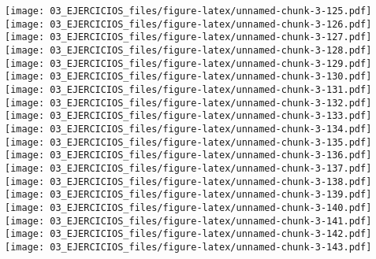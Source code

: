\documentclass[
]{book}
\newenvironment{Shaded}{\begin{snugshade}}{\end{snugshade}}
\newcommand{\AttributeTok}[1]{\textcolor[rgb]{0.77,0.63,0.00}{#1}}
\newcommand{\DecValTok}[1]{\textcolor[rgb]{0.00,0.00,0.81}{#1}}
\newcommand{\FloatTok}[1]{\textcolor[rgb]{0.00,0.00,0.81}{#1}}
\newcommand{\FunctionTok}[1]{\textcolor[rgb]{0.00,0.00,0.00}{#1}}
\newcommand{\NormalTok}[1]{#1}
\newcommand{\OtherTok}[1]{\textcolor[rgb]{0.56,0.35,0.01}{#1}}
\newcommand{\SpecialCharTok}[1]{\textcolor[rgb]{0.00,0.00,0.00}{#1}}
\newcommand{\StringTok}[1]{\textcolor[rgb]{0.31,0.60,0.02}{#1}}
\begin{document}
\texttt{[image: 03\_EJERCICIOS\_files/figure-latex/unnamed-chunk-3-125.pdf]} \texttt{[image: 03\_EJERCICIOS\_files/figure-latex/unnamed-chunk-3-126.pdf]} \texttt{[image: 03\_EJERCICIOS\_files/figure-latex/unnamed-chunk-3-127.pdf]} \texttt{[image: 03\_EJERCICIOS\_files/figure-latex/unnamed-chunk-3-128.pdf]} \texttt{[image: 03\_EJERCICIOS\_files/figure-latex/unnamed-chunk-3-129.pdf]} \texttt{[image: 03\_EJERCICIOS\_files/figure-latex/unnamed-chunk-3-130.pdf]} \texttt{[image: 03\_EJERCICIOS\_files/figure-latex/unnamed-chunk-3-131.pdf]} \texttt{[image: 03\_EJERCICIOS\_files/figure-latex/unnamed-chunk-3-132.pdf]} \texttt{[image: 03\_EJERCICIOS\_files/figure-latex/unnamed-chunk-3-133.pdf]} \texttt{[image: 03\_EJERCICIOS\_files/figure-latex/unnamed-chunk-3-134.pdf]} \texttt{[image: 03\_EJERCICIOS\_files/figure-latex/unnamed-chunk-3-135.pdf]} \texttt{[image: 03\_EJERCICIOS\_files/figure-latex/unnamed-chunk-3-136.pdf]} \texttt{[image: 03\_EJERCICIOS\_files/figure-latex/unnamed-chunk-3-137.pdf]} \texttt{[image: 03\_EJERCICIOS\_files/figure-latex/unnamed-chunk-3-138.pdf]} \texttt{[image: 03\_EJERCICIOS\_files/figure-latex/unnamed-chunk-3-139.pdf]} \texttt{[image: 03\_EJERCICIOS\_files/figure-latex/unnamed-chunk-3-140.pdf]} \texttt{[image: 03\_EJERCICIOS\_files/figure-latex/unnamed-chunk-3-141.pdf]} \texttt{[image: 03\_EJERCICIOS\_files/figure-latex/unnamed-chunk-3-142.pdf]} \texttt{[image: 03\_EJERCICIOS\_files/figure-latex/unnamed-chunk-3-143.pdf]}

\begin{Shaded}
\end{Shaded}
\end{document}
